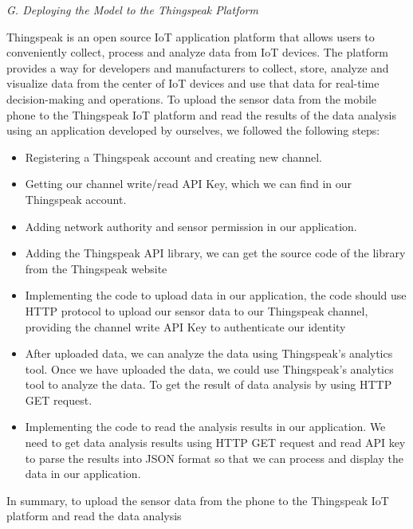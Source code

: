 \begin{spacing}{1.25}
\textit{G. Deploying the Model to the Thingspeak Platform}    
\end{spacing}
Thingspeak is an open source IoT application platform
that allows users to conveniently collect, process and
analyze data from IoT devices. The platform provides
a way for developers and manufacturers to collect, store,
analyze and visualize data from the center of IoT devices
and use that data for real-time decision-making and
operations.
To upload the sensor data from the mobile phone to the
Thingspeak IoT platform and read the results of the data
analysis using an application developed by ourselves, we
followed the following steps:
\begin{itemize}
    \renewcommand{\labelitemi}{1)}
        \item Registering a Thingspeak account and creating new
channel.
    \renewcommand{\labelitemi}{2)}
        \item   Getting our channel write/read API Key, which we
can find in our Thingspeak account.
    \renewcommand{\labelitemi}{3)}
        \item Adding network authority and sensor permission
in our application.
    \renewcommand{\labelitemi}{4)}
        \item Adding the Thingspeak API library, we can get
the source code of the library from the Thingspeak
website 
    \renewcommand{\labelitemi}{5)}
        \item   Implementing the code to upload data in our application, the code should use HTTP protocol to
upload our sensor data to our Thingspeak channel,
providing the channel write API Key to authenticate our identity
    \renewcommand{\labelitemi}{6)}
        \item   After uploaded data, we can analyze the data
using Thingspeak’s analytics tool. Once we have
uploaded the data, we could use Thingspeak’s
analytics tool to analyze the data. To get the result
of data analysis by using HTTP GET request.
    \renewcommand{\labelitemi}{7)}
        \item   Implementing the code to read the analysis results
in our application. We need to get data analysis
results using HTTP GET request and read API key
to parse the results into JSON format so that we
can process and display the data in our application.
\end{itemize}
In summary, to upload the sensor data from the phone
to the Thingspeak IoT platform and read the data analysis
